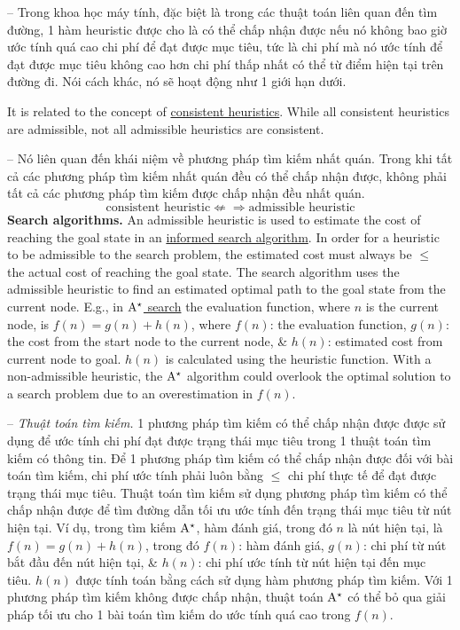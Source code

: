 \documentclass{article}
\begin{document}
-- Trong khoa học máy tính, đặc biệt là trong các thuật toán liên quan đến tìm đường, 1 hàm heuristic được cho là có thể chấp nhận được nếu nó không bao giờ ước tính quá cao chi phí để đạt được mục tiêu, tức là chi phí mà nó ước tính để đạt được mục tiêu không cao hơn chi phí thấp nhất có thể từ điểm hiện tại trên đường đi. Nói cách khác, nó sẽ hoạt động như 1 giới hạn dưới.

It is related to the concept of \href{https://en.wikipedia.org/wiki/Consistent_heuristic}{consistent heuristics}. While all consistent heuristics are admissible, not all admissible heuristics are consistent.

-- Nó liên quan đến khái niệm về phương pháp tìm kiếm nhất quán. Trong khi tất cả các phương pháp tìm kiếm nhất quán đều có thể chấp nhận được, không phải tất cả các phương pháp tìm kiếm được chấp nhận đều nhất quán.
\begin{equation*}
	\mbox{consistent heuristic}\not\Leftarrow\Rightarrow\mbox{admissible heuristic}
\end{equation*}
{\bf Search algorithms.} An admissible heuristic is used to estimate the cost of reaching the goal state in an \href{https://en.wikipedia.org/wiki/Informed_search_algorithm}{informed search algorithm}. In order for a heuristic to be admissible to the search problem, the estimated cost must always be $\le$ the actual cost of reaching the goal state. The search algorithm uses the admissible heuristic to find an estimated optimal path to the goal state from the current node. E.g., in \href{https://en.wikipedia.org/wiki/A*_search}{$\rm A^\star$ search} the evaluation function, where $n$ is the current node, is $f(n) = g(n) + h(n)$, where $f(n)$: the evaluation function, $g(n)$: the cost from the start node to the current node, \& $h(n)$: estimated cost from current node to goal. $h(n)$ is calculated using the heuristic function. With a non-admissible heuristic, the $\rm A^\star$ algorithm could overlook the optimal solution to a search problem due to an overestimation in $f(n)$.

-- {\it Thuật toán tìm kiếm.} 1 phương pháp tìm kiếm có thể chấp nhận được được sử dụng để ước tính chi phí đạt được trạng thái mục tiêu trong 1 thuật toán tìm kiếm có thông tin. Để 1 phương pháp tìm kiếm có thể chấp nhận được đối với bài toán tìm kiếm, chi phí ước tính phải luôn bằng $\le$ chi phí thực tế để đạt được trạng thái mục tiêu. Thuật toán tìm kiếm sử dụng phương pháp tìm kiếm có thể chấp nhận được để tìm đường dẫn tối ưu ước tính đến trạng thái mục tiêu từ nút hiện tại. Ví dụ, trong tìm kiếm $\rm A^\star$, hàm đánh giá, trong đó $n$ là nút hiện tại, là $f(n) = g(n) + h(n)$, trong đó $f(n)$: hàm đánh giá, $g(n)$: chi phí từ nút bắt đầu đến nút hiện tại, \& $h(n)$: chi phí ước tính từ nút hiện tại đến mục tiêu. $h(n)$ được tính toán bằng cách sử dụng hàm phương pháp tìm kiếm. Với 1 phương pháp tìm kiếm không được chấp nhận, thuật toán $\rm A^\star$ có thể bỏ qua giải pháp tối ưu cho 1 bài toán tìm kiếm do ước tính quá cao trong $f(n)$.
\end{document}
